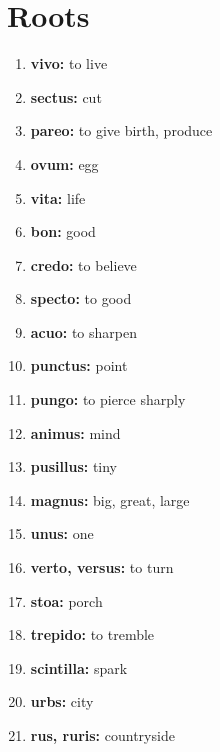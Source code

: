 \documentclass{article}
\begin{document}
\section{Roots}
\begin{enumerate}
    \item \textbf{vivo: }{to live}
    \item \textbf{sectus: }{cut}
    \item \textbf{pareo: }{to give birth, produce}
    \item \textbf{ovum: }{egg}
    \item \textbf{vita: }{life}
    \item \textbf{bon: }{good}
    \item \textbf{credo: }{to believe}
    \item \textbf{specto: }{to good}
    \item \textbf{acuo: }{to sharpen}
    \item \textbf{punctus: }{point}
    \item \textbf{pungo: }{to pierce sharply}
    \item \textbf{animus: }{mind}
    \item \textbf{pusillus: }{tiny}
    \item \textbf{magnus: }{big, great, large}
    \item \textbf{unus: }{one}
    \item \textbf{verto, versus: }{to turn}
    \item \textbf{stoa: }{porch}
    \item \textbf{trepido: }{to tremble}
    \item \textbf{scintilla: }{spark}
    \item \textbf{urbs: }{city}
    \item \textbf{rus, ruris: }{countryside}
    
\end{enumerate}
\end{document}
